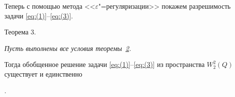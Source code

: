 \smallskip




Теперь с помощью метода <<$\varepsilon $"=ре\-гуляризации>> покажем  разрешимость  задачи \eqref{eq:(1)}--\eqref{eq:(3)}.



\smallskip



\hypertarget{dzh:th3}{}



{\small\sc Теорема 3.}  {\it Пусть выполнены все условия теоремы~{\rm \hyperlink{dzh:th2}{2}.} 

Тогда обобщенное решение задачи \eqref{eq:(1)}--\eqref{eq:(3)} из  пространства $W_{2}^{2}(Q)$ существует и  единственно}.



\smallskip



